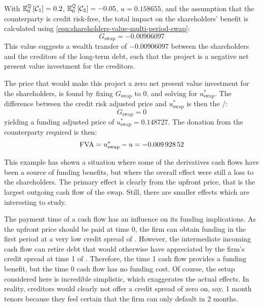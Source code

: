 \documentclass[main.tex]{subfiles}
\begin{document}
        With $\mathbb{E}_{0}^{\mathbb{Q}}\left[\mathcal{C}_1\right]=\num{0.2}$,
        $\mathbb{E}_{0}^{\mathbb{Q}}\left[\mathcal{C}_2\right]=\num{-0.05}$,
        $u=\num{0.158655}$,
        and the assumption that the counterparty is credit risk-free,
        the total impact on the shareholders' benefit is calculated using \cref{eqn:shareholders-value-multi-period-swap}:
        \begin{equation*}
            G_{\text{swap}} = \num{-0.00906097}
        \end{equation*}
        This value suggests a wealth transfer of $\num{-0.00906097}$
        between the shareholders and the creditors of the long-term debt,
        such that the project is a negative net present value investment for the creditors.

        The price that would make this project a zero net present value investment for the shareholders,
        is found by fixing $G_{\text{swap}}$ to 0,
        and solving for $u^{\ast}_{\text{swap}}$.
        The difference between the credit risk adjusted price and $u^{\ast}_{\text{swap}}$ is then the \FVA/:
        \begin{equation*}
            G_{\text{swap}} = 0
        \end{equation*}
        yielding a funding adjusted price of $u^{\ast}_{\text{swap}} = \num{0.148727}$.
        The donation from the counterparty required is then:
        \begin{equation*}
            \FVA/ = u^{\ast}_{\text{swap}} - u = \num{-0.00992852}
        \end{equation*}

        This example has shown a situation where some of the derivatives cash flows have
        been a source of funding benefits,
        but where the overall effect were still a loss to the shareholders.
        The primary effect is clearly from the upfront price,
        that is the largest outgoing cash flow of the swap.
        Still, there are smaller effects which are interesting to study.

        The payment time of a cash flow has an influence on its funding implications.
        As the upfront price should be paid at time 0, 
        the firm can obtain funding in the first period at a very low credit spread of .
        However, the intermediate incoming cash flow can retire debt
        that would otherwise have appreciated 
        by the firm's credit spread at time 1 of .
        Therefore, the time 1 cash flow provides a funding benefit,
        but the time 0 cash flow has no funding cost.
        Of course, the setup considered here is incredible simplistic,
        which exaggerates the actual effects.
        In reality, creditors would clearly not offer a credit spread of zero on, say,
        1 month tenors because they feel certain that the firm can only default in 2 months.
\end{document}
